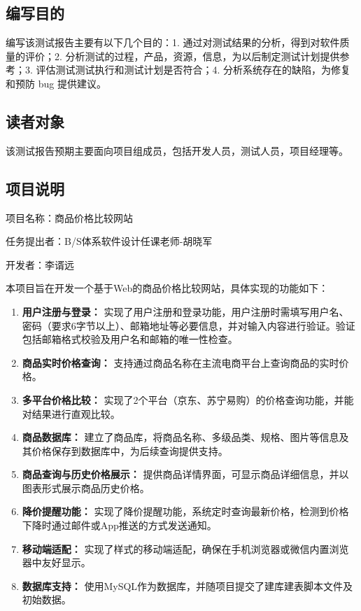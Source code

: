 \documentclass[12pt]{article}
\begin{document}
\subsection{编写目的}

编写该测试报告主要有以下几个目的：1. 通过对测试结果的分析，得到对软件质量的评价；2. 分析测试的过程，产品，资源，信息，为以后制定测试计划提供参考；3. 评估测试测试执行和测试计划是否符合；4. 分析系统存在的缺陷，为修复和预防 bug 提供建议。

\subsection{读者对象}

该测试报告预期主要面向项目组成员，包括开发人员，测试人员，项目经理等。

\subsection{项目说明}

项目名称：商品价格比较网站

任务提出者：B/S体系软件设计任课老师-胡晓军

开发者：李谞远

本项目旨在开发一个基于Web的商品价格比较网站，具体实现的功能如下：

\begin{enumerate}
  \item \textbf{用户注册与登录：}
  实现了用户注册和登录功能，用户注册时需填写用户名、密码（要求6字节以上）、邮箱地址等必要信息，并对输入内容进行验证。验证包括邮箱格式校验及用户名和邮箱的唯一性检查。

  \item \textbf{商品实时价格查询：}  
  支持通过商品名称在主流电商平台上查询商品的实时价格。

  \item \textbf{多平台价格比较：}  
  实现了2个平台（京东、苏宁易购）的价格查询功能，并能对结果进行直观比较。

  \item \textbf{商品数据库：}  
  建立了商品库，将商品名称、多级品类、规格、图片等信息及其价格保存到数据库中，为后续查询提供支持。

  \item \textbf{商品查询与历史价格展示：}  
  提供商品详情界面，可显示商品详细信息，并以图表形式展示商品历史价格。

  \item \textbf{降价提醒功能：}  
  实现了降价提醒功能，系统定时查询最新价格，检测到价格下降时通过邮件或App推送的方式发送通知。

  \item \textbf{移动端适配：}  
  实现了样式的移动端适配，确保在手机浏览器或微信内置浏览器中友好显示。

  \item \textbf{数据库支持：}  
  使用MySQL作为数据库，并随项目提交了建库建表脚本文件及初始数据。
\end{enumerate}
\end{document}
